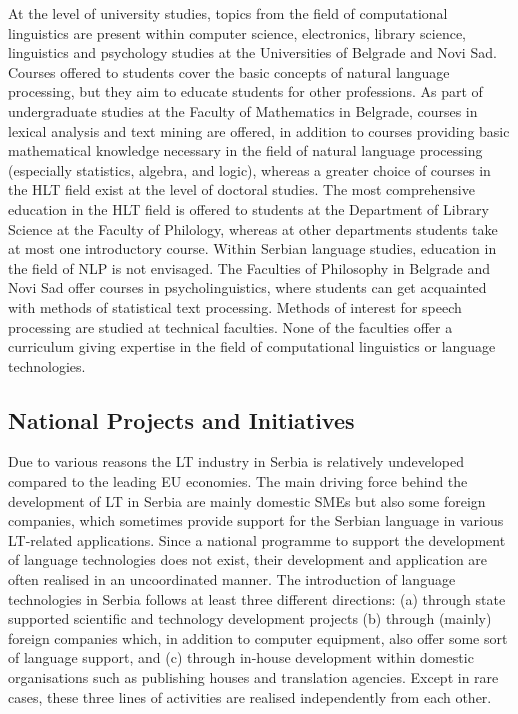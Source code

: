 {\begin{multicols}{2}
At the level of university studies, topics from the field of computational linguistics are present within computer science, electronics, library science, linguistics and psychology studies at the Universities of Belgrade and Novi Sad. Courses offered to students cover the basic concepts of natural language processing, but they aim to educate students for other professions. As part of undergraduate studies at the Faculty of Mathematics in Belgrade, courses in lexical analysis and text mining are offered, in addition to courses providing basic mathematical knowledge necessary in the field of natural language processing (especially statistics, algebra, and logic), whereas a greater choice of courses in the HLT field exist at the level of doctoral studies. The most comprehensive education in the HLT field is offered to students at the Department of Library Science at the Faculty of Philology, whereas at other departments students take at most one introductory course. Within Serbian language studies, education in the field of NLP is not envisaged. The Faculties of Philosophy in Belgrade and Novi Sad offer courses in psycholinguistics, where students can get acquainted with methods of statistical text processing. Methods of interest for speech processing are studied at technical faculties. None of the faculties offer a curriculum giving expertise in the field of computational linguistics or language technologies. 
 

 \subsection {National Projects and Initiatives}

Due to various reasons the LT industry in Serbia is relatively undeveloped compared to the leading EU economies. The main driving force behind the development of LT in Serbia are mainly domestic SMEs but also some foreign companies, which sometimes provide support for the Serbian language in various LT-related applications. Since a national programme to support the development of language technologies does not exist, their development and application are often realised in an uncoordinated manner. The introduction of language technologies in Serbia follows at least three different directions: (a) through state supported scientific and technology development projects (b) through (mainly) foreign companies which, in addition to computer equipment, also offer some sort of language support, and (c) through in-house development within domestic organisations such as publishing houses and translation agencies. Except in rare cases, these three lines of activities are realised independently from each other. 


\end{multicols}}
